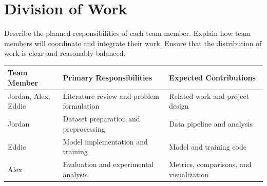 \documentclass[11pt]{article}
\newcommand{\blue}[1]{\textcolor{cyan!60!black}{#1}}
\begin{document}
\section{Division of Work}

Describe the planned responsibilities of each team member. Explain how team members will coordinate and integrate their work.
Ensure that the distribution of work is clear and reasonably balanced.

\begin{center}
\begin{tabularx}{\textwidth}{l X X}
    \toprule
    \textbf{Team Member} &
    \textbf{Primary Responsibilities} &
    \textbf{Expected Contributions} \\
    \midrule
    \blue{Jordan, Alex, Eddie} & Literature review and problem formulation & Related work and project design \\
    \blue{Jordan} & Dataset preparation and preprocessing & Data pipeline and analysis \\
    \blue{Eddie} & Model implementation and training & Model and training code \\
    \blue{Alex} & Evaluation and experimental analysis & Metrics, comparisons, and visualization \\
    \bottomrule
\end{tabularx}
\end{center}







\end{document}
